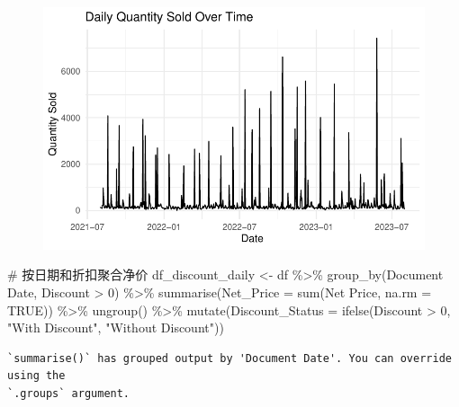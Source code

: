 \documentclass[
  letterpaper,
  DIV=11,
  numbers=noendperiod]{scrartcl}
\newenvironment{Shaded}{\begin{snugshade}}{\end{snugshade}}
\newcommand{\AttributeTok}[1]{\textcolor[rgb]{0.40,0.45,0.13}{#1}}
\newcommand{\CommentTok}[1]{\textcolor[rgb]{0.37,0.37,0.37}{#1}}
\newcommand{\ConstantTok}[1]{\textcolor[rgb]{0.56,0.35,0.01}{#1}}
\newcommand{\DecValTok}[1]{\textcolor[rgb]{0.68,0.00,0.00}{#1}}
\newcommand{\FunctionTok}[1]{\textcolor[rgb]{0.28,0.35,0.67}{#1}}
\newcommand{\NormalTok}[1]{\textcolor[rgb]{0.00,0.23,0.31}{#1}}
\newcommand{\OtherTok}[1]{\textcolor[rgb]{0.00,0.23,0.31}{#1}}
\newcommand{\SpecialCharTok}[1]{\textcolor[rgb]{0.37,0.37,0.37}{#1}}
\newcommand{\StringTok}[1]{\textcolor[rgb]{0.13,0.47,0.30}{#1}}
\begin{document}
\begin{figure}[H]

{\centering \includegraphics{Time-Serise-EDA_files/figure-pdf/unnamed-chunk-2-4.pdf}

}

\end{figure}

\begin{Shaded}
\begin{Highlighting}[]
\CommentTok{\# 按日期和折扣聚合净价}
\NormalTok{df\_discount\_daily }\OtherTok{\textless{}{-}}\NormalTok{ df }\SpecialCharTok{\%\textgreater{}\%}
  \FunctionTok{group\_by}\NormalTok{(}\StringTok{\textasciigrave{}}\AttributeTok{Document Date}\StringTok{\textasciigrave{}}\NormalTok{, Discount }\SpecialCharTok{\textgreater{}} \DecValTok{0}\NormalTok{) }\SpecialCharTok{\%\textgreater{}\%}
  \FunctionTok{summarise}\NormalTok{(}\AttributeTok{Net\_Price =} \FunctionTok{sum}\NormalTok{(}\StringTok{\textasciigrave{}}\AttributeTok{Net Price}\StringTok{\textasciigrave{}}\NormalTok{, }\AttributeTok{na.rm =} \ConstantTok{TRUE}\NormalTok{)) }\SpecialCharTok{\%\textgreater{}\%}
  \FunctionTok{ungroup}\NormalTok{() }\SpecialCharTok{\%\textgreater{}\%}
  \FunctionTok{mutate}\NormalTok{(}\AttributeTok{Discount\_Status =} \FunctionTok{ifelse}\NormalTok{(}\StringTok{\textasciigrave{}}\AttributeTok{Discount \textgreater{} 0}\StringTok{\textasciigrave{}}\NormalTok{, }\StringTok{"With Discount"}\NormalTok{, }\StringTok{"Without Discount"}\NormalTok{))}
\end{Highlighting}
\end{Shaded}

\begin{verbatim}
`summarise()` has grouped output by 'Document Date'. You can override using the
`.groups` argument.
\end{verbatim}
\end{document}
